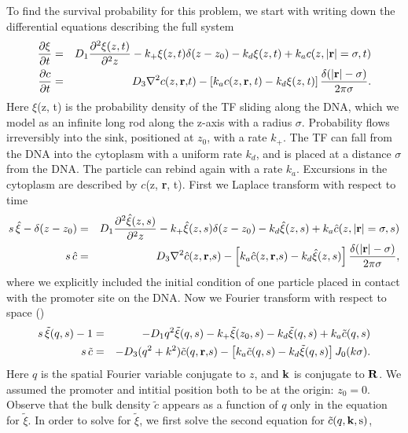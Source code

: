 To find the survival probability for this problem, we start with writing down the differential equations describing the full system
\setlength{\jot}{12pt}
\begin{eqnarray*}
 \frac{\partial \xi}{\partial t} & = & D_1 \frac{\partial^2\xi(z,t)}{\partial^2 z} - k_+ \xi(z,t) \delta(z - z_0) - k_d \xi(z,t) + k_a c(z, |{\bf r}| = \sigma, t) \\
 \frac{\partial c}{\partial t} & = & D_3 \nabla^2 c(z, \mathbf r \mathrm, t) - \left[ k_a c(z, \bf r \it, t) - k_d \xi(z,t) \right] \frac{\delta(|\mathbf r \mathrm| - \sigma)}{2 \pi \sigma}.
\end{eqnarray*}
Here $\xi$(z, t) is the probability density of the TF sliding along the DNA, which we model as an infinite long rod along the z-axis with a radius $\sigma$. Probability flows irreversibly into the sink, positioned at $z_0$, with a rate $k_+$. The TF can fall from the DNA into the cytoplasm with a uniform rate $k_d$, and is placed at a distance $\sigma$ from the DNA. The particle can rebind again with a rate $k_a$. Excursions in the cytoplasm are described by $c$(z, {\bf r}, t). First we Laplace transform with respect to time
\begin{eqnarray*}
 s \, \hat{\xi} - \delta(z - z_0) & = & D_1 \frac{\partial^2\hat{\xi}(z,s)}{\partial^2 z} - k_+ \hat{\xi}(z,s) \delta(z - z_0) - k_d \hat{\xi}(z,s) + k_a \hat{c}(z, |{\bf r}| = \sigma, s) \\
 s \, \hat{c} & = & D_3 \nabla^2 \hat{c}(z, \mathbf r \mathrm, s) - \left[ k_a \hat{c}(z, \mathbf r \mathrm, s) - k_d \hat{\xi}(z,s) \right] \frac{\delta(|\mathbf r \mathrm| - \sigma)}{2 \pi \sigma},
\end{eqnarray*}
where we explicitly included the initial condition of one particle placed in contact with the promoter site on the DNA. Now we Fourier transform with respect to space ()
\begin{eqnarray}
 s \, \tilde{\xi}(q, s) - 1 & = & - D_1 q^2 \tilde{\xi}(q,s) - k_+ \tilde{\xi}(z_0,s) - k_d \tilde{\xi}(q,s) + k_a \tilde{c}(q, s) \elabel{FDE_dna} \\
 s \, \tilde{c} & = & - D_3 (q^2 + k^2) \tilde{c}(q, \mathbf r \mathrm, s) - \left[ k_a \tilde{c}(q, s) - k_d \tilde{\xi}(q,s) \right] J_{0}(k \sigma). 
 \elabel{FDE_bulk}
\end{eqnarray}
Here $q$ is the spatial Fourier variable conjugate to $z$, and $\bf k \rm$ is conjugate to $\bf R \bf$. We assumed the promoter and intitial position both to be at the origin: $z_0 = 0$. Observe that the bulk density $\tilde{c}$ appears as a function of $q$ only in the equation for $\tilde{\xi}$. In order to solve for $\tilde{\xi}$, we first solve the second equation for $\tilde{c}(q,\bf k \rm, s)$, 
